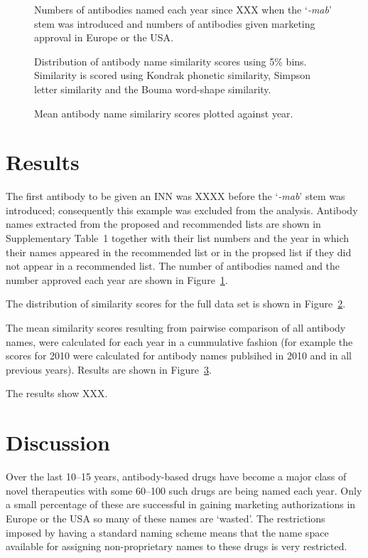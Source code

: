 \documentclass{article}
\newcommand{\eg}[1]{`\emph{#1}'}
\begin{document}
\begin{figure}
\caption{\label{fig:namesandapproved}Numbers of antibodies named each
  year since XXX when the \eg{-mab} stem was introduced and numbers of
  antibodies given marketing approval in Europe or the USA.}
\end{figure}



\begin{figure}
\begin{center}
\end{center}
 \caption{\label{fig:distrib} Distribution of antibody name similarity
   scores using 5\% bins. Similarity is scored using Kondrak phonetic
   similarity, Simpson letter similarity and the Bouma word-shape
   similarity.}
\end{figure}



\begin{figure}
  \caption{\label{fig:results} Mean antibody name similariry
    scores plotted against year.}
\end{figure}



\section{Results}
The first antibody to be given an INN was XXXX before the \eg{-mab}
stem was introduced; consequently this example was excluded from the
analysis. Antibody names extracted from the proposed and recommended
lists are shown in Supplementary Table~1 together with their list
numbers and the year in which their names appeared in the recommended
list or in the propsed list if they did not appear in a recommended
list. The number of antibodies named and the number approved each year
are shown in Figure~\ref{fig:namesandapproved}.

The distribution of similarity scores for the full data set is shown in
Figure~\ref{fig:distrib}. 

The mean similarity scores resulting from pairwise comparison of all
antibody names, were calculated for each year in a cummulative fashion
(for example the scores for 2010 were calculated for antibody names
publsihed in 2010 and in all previous years). Results are shown in
Figure~\ref{fig:results}. 

The results show XXX.

\section{Discussion}
Over the last 10--15 years, antibody-based drugs have become a major
class of novel therapeutics with some 60--100 such drugs are being
named each year. Only a small percentage of these are successful in
gaining marketing authorizations in Europe or the USA so many of these
names are `wasted'. The restrictions imposed by having a standard
naming scheme means that the name space available for assigning
non-proprietary names to these drugs is very restricted.
\end{document}
